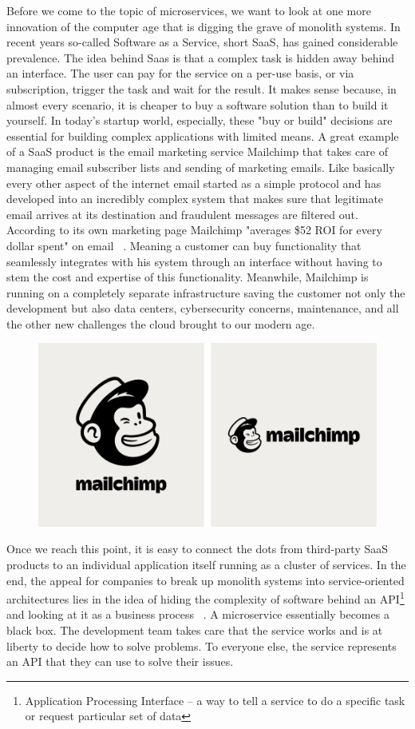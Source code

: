 Before we come to the topic of microservices, we want to look at one more innovation of the computer age that is digging the grave of monolith systems. In recent years so-called Software as a Service, short SaaS, has gained considerable prevalence. The idea behind Saas is that a complex task is hidden away behind an interface. The user can pay for the service on a per-use basis, or via subscription, trigger the task and wait for the result. It makes sense because, in almost every scenario, it is cheaper to buy a software solution than to build it yourself. In today's startup world, especially, these "buy or build" decisions are essential for building complex applications with limited means. A great example of a SaaS product is the email marketing service Mailchimp that takes care of managing email subscriber lists and sending of marketing emails. Like basically every other aspect of the internet email started as a simple protocol and has developed into an incredibly complex system that makes sure that legitimate email arrives at its destination and fraudulent messages are filtered out. According to its own marketing page Mailchimp "averages \$52 ROI for every dollar spent" on email ~\cite{mailchimp.2020}. Meaning a customer can buy functionality that seamlessly integrates with his system through an interface without having to stem the cost and expertise of this functionality. Meanwhile, Mailchimp is running on a completely separate infrastructure saving the customer not only the development but also data centers, cybersecurity concerns, maintenance, and all the other new challenges the cloud brought to our modern age.

\begin{figure}[ht]
  \centering
  \includegraphics[width=0.8\linewidth]{assets/mailchimp-brand.png}
\end{figure}

Once we reach this point, it is easy to connect the dots from third-party SaaS products to an individual application itself running as a cluster of services. In the end, the appeal for companies to break up monolith systems into service-oriented architectures lies in the idea of hiding the complexity of software behind an API\footnote{Application Processing Interface – a way to tell a service to do a specific task or request particular set of data} and looking at it as a business process ~\cite[p.~359]{melzer.2010}. A microservice essentially becomes a black box. The development team takes care that the service works and is at liberty to decide how to solve problems. To everyone else, the service represents an API that they can use to solve their issues.


